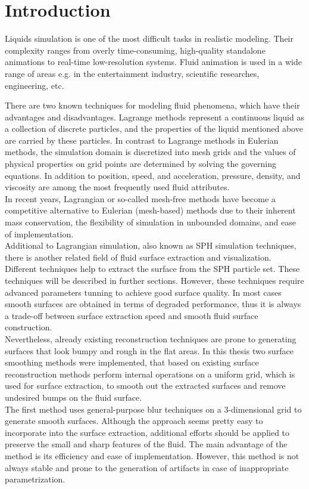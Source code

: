 \chapter{Introduction}
Liquids simulation is one of the most difficult tasks in realistic modeling. Their complexity ranges from overly time-consuming, high-quality standalone animations to real-time low-resolution systems. Fluid animation is used in a wide range of areas e.g. in the entertainment industry, scientific researches, engineering, etc. 

There are two known techniques for modeling fluid phenomena, which have their advantages and disadvantages. Lagrange methods represent a continuous liquid as a collection of discrete particles, and the properties of the liquid mentioned above are carried by these particles. In contrast to Lagrange methods in Eulerian methods, the simulation domain is discretized into mesh grids and the values of physical properties on grid points are determined by solving the governing equations. In addition to position, speed, and acceleration, pressure, density, and viscosity are among the most frequently used fluid attributes.\\
In recent years, Lagrangian or so-called mesh-free methods have become a competitive alternative to Eulerian (mesh-based) methods due to their inherent mass conservation, the flexibility of simulation in unbounded domains, and ease of implementation.\\
Additional to Lagrangian simulation, also known as SPH simulation techniques, there is another related field of fluid surface extraction and visualization. Different techniques help to extract the surface from the SPH particle set. These techniques will be described in further sections. However, these techniques require advanced parameters tunning to achieve good surface quality. In most cases smooth surfaces are obtained in terms of degraded performance, thus it is always a trade-off between surface extraction speed and smooth fluid surface construction.\\
Nevertheless, already existing reconstruction techniques are prone to generating surfaces that look bumpy and rough in the flat areas. In this thesis two surface smoothing methods were implemented, that based on existing surface reconstruction methods perform internal operations on a uniform grid, which is used for surface extraction, to smooth out the extracted surfaces and remove undesired bumps on the fluid surface.\\
The first method uses general-purpose blur techniques on a 3-dimensional grid to generate smooth surfaces. Although the approach seems pretty easy to incorporate into the surface extraction, additional efforts should be applied to preserve the small and sharp features of the fluid. The main advantage of the method is its efficiency and ease of implementation. However, this method is not always stable and prone to the generation of artifacts in case of inappropriate parametrization.\\
